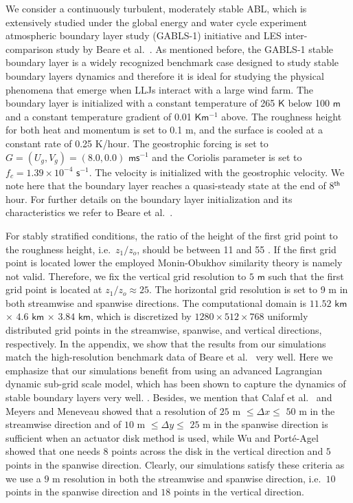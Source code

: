 \documentclass[%
 aip,
 amsmath,amssymb,
preprint,%
author-numerical,%
]{revtex4-1}
\begin{document}
We consider a continuously turbulent, moderately stable ABL, which is extensively studied under the global energy and water cycle experiment atmospheric boundary layer study (GABLS-1) initiative and LES inter-comparison study by Beare et al.\ \cite{bea06, kos00}. As mentioned before, the GABLS-1 stable boundary layer is a widely recognized benchmark case designed to study stable boundary layers dynamics and therefore it is ideal for studying the physical phenomena that emerge when LLJs interact with a large wind farm. The boundary layer is initialized with a constant temperature of 265 $\mathsf{K}$ below 100 $\mathsf{m}$ and a constant temperature gradient of 0.01 $\mathsf{K}\mathsf{m}^{-1}$ above. The roughness height for both heat and momentum is set to 0.1 m, and the surface is cooled at a constant rate of 0.25 K/hour. The geostrophic forcing is set to $G=(U_g,V_g)=(8.0,0.0)$ $\mathsf{m}\mathsf{s}^{-1}$ and the Coriolis parameter is set to $f_c=1.39\times10^{-4}$ $\mathsf{s}^{-1}$. The velocity is initialized with the geostrophic velocity. We note here that the boundary layer reaches a quasi-steady state at the end of 8$^\mathsf{th}$ hour. For further details on the boundary layer initialization and its characteristics we refer to Beare et al.\ \cite{bea06}. 

For stably stratified conditions, the ratio of the height of the first grid point to the roughness height, i.e.\ $z_1/z_o$, should be between 11 and 55 \cite{gar83, bas17}. If the first grid point is located lower the employed Monin-Obukhov similarity theory is namely not valid. Therefore, we fix the vertical grid resolution to $5$ $\mathsf{m}$ such that the first grid point is located at $z_1/z_o\approx25$. The horizontal grid resolution is set to 9 m in both streamwise and spanwise directions. The computational domain is $11.52$ $\mathsf{km}$ $\times$ $4.6$ $\mathsf{km}$ $\times$ $3.84$ $\mathsf{km}$, which is discretized by $1280\times512\times768$ uniformly distributed grid points in the streamwise, spanwise, and vertical directions, respectively. In the appendix, we show that the results from our simulations match the high-resolution benchmark data of Beare et al.\ \cite{bea06} very well. Here we emphasize that our simulations benefit from using an advanced Lagrangian dynamic sub-grid scale model, which has been shown to capture the dynamics of stable boundary layers very well. \cite{sto08, nag19}. Besides, we mention that Calaf et al.\ \cite{cal10} and Meyers and Meneveau \cite{mey13} showed that a resolution of $25$ m $\leq \Delta{x} \leq$ $50$ m in the streamwise direction and of $10$ m $\leq \Delta{y}\leq$ $25$ m in the spanwise direction is sufficient when an actuator disk method is used, while Wu and Port\'e-Agel \cite{wu11} showed that one needs $8$ points across the disk in the vertical direction and $5$ points in the spanwise direction. Clearly, our simulations satisfy these criteria as we use a $9$ m resolution in both the streamwise and spanwise direction, i.e.\ $10$ points in the spanwise direction and $18$ points in the vertical direction.
\end{document}
